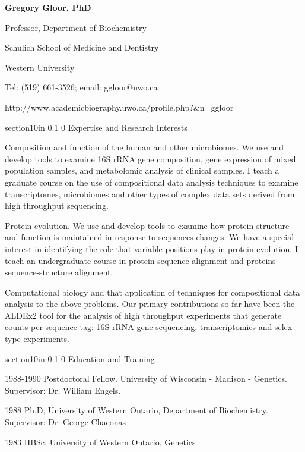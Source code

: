 \documentclass[11pt]{article}
\makeatletter
\renewcommand\section{\@startsection
	{section}{1}{0in}%
	{0.1\baselineskip}%
	{0\baselineskip}%
	{\sffamily\bfseries\large}
}
\makeatother
\begin{document}
\begin{center}
\textbf{Gregory Gloor, PhD}

Professor, Department of Biochemistry

Schulich School of Medicine and Dentistry

Western University

Tel: (519) 661-3526; email: ggloor@uwo.ca 
 
http://www.academicbiography.uwo.ca/profile.php?\&n=ggloor
\end{center}
\section{Expertise and Research Interests}
\begin{description}\itemsep=-2pt
\item Composition and function of the human and other microbiomes. We use and develop tools to examine 16S rRNA gene composition, gene expression of mixed population samples, and metabolomic analysis of clinical samples. I teach a graduate course on the use of compositional data analysis techniques to examine transcriptomes, microbiomes and other types of complex data sets derived from high throughput sequencing. 
\item Protein evolution. We use and develop tools to examine how protein structure and function is maintained in response to sequences changes. We have a special interest in identifying the role that variable positions play in protein evolution. I teach an undergraduate course in protein sequence alignment and proteins sequence-structure alignment. 
\item Computational biology and that application of techniques for compositional data analysis to the above problems. Our primary contributions so far have been the ALDEx2 tool for the analysis of high throughput experiments that generate counts per sequence tag: 16S rRNA gene sequencing, transcriptomics and selex-type experiments.
\end{description}

\section{Education and Training}
\begin{description}\itemsep=-2pt
\item 1988-1990  Postdoctoral Fellow.  University of Wisconsin - Madison - Genetics. Supervisor: Dr. William Engels.
\item 1988  Ph.D, University of Western Ontario, Department of Biochemistry. Supervisor: Dr. George Chaconas
\item 1983  HBSc, University of Western Ontario, Genetics
\end{description}
\end{document}

